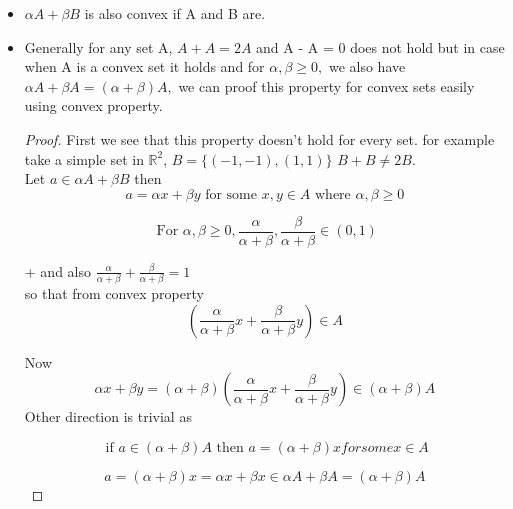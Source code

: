 \documentclass[oneside]{book}
\begin{document}
	
	\begin{itemize}
		\item $\alpha A+\beta B $ is also convex if A and B are. 
		\item
		Generally for any set A, $A +A = 2A $ and A - A = 0  does not hold but in case when A is a convex set it holds and 
		for $\alpha, \beta \geq 0,$ we also have $\alpha A+\beta A=(\alpha+\beta) A,$ we can proof this property for convex sets easily using convex property.
		\begin{proof}
			First we see that this property doesn't hold for every set.
			for example take a simple set in $\mathbb{R}^2$, $B = \{ (-1,-1),(1,1)\}$  $ B + B \neq 2B. $ \\
			Let $a \in \alpha A  + \beta B $ then $$a = \alpha x + \beta y \text{ for some } x, y \in A \text{ where } \alpha, \beta \geq 0 $$
			
			$$
			\text{ For } \alpha, \beta \geq 0, \frac{\alpha}{\alpha+\beta}, \frac{\beta}{\alpha+\beta} \in (0, 1) $$
			
			+ and also
			$ \frac{\alpha}{\alpha+\beta}+\frac{\beta}{\alpha+\beta}=1$ \\
			so that from convex property $$\left(\frac{\alpha}{\alpha+\beta} x+\frac{\beta}{\alpha+\beta} y\right) \in A
			$$
			
			Now 
			\[
			\alpha x+\beta y=(\alpha+\beta)\left(\frac{\alpha}{\alpha+\beta} x+\frac{\beta}{\alpha+\beta} y\right) \in(\alpha+\beta) A
			\]
			Other direction is trivial as 
			
			$$ \text{ if } a \in (\alpha +\beta) A \text{ then }
			a = (\alpha +\beta)x for some x \in A $$ 
			
			$$
			a = (\alpha +\beta)x =  \alpha x +\beta x \in \alpha A +\beta A
			= (\alpha + \beta )A $$
			
		\end{proof}
		
		
		
		
		
		
		
		
		
		
		
		
		
		
		
		
		
		
		
		
		
		
		
		
		
		
		
		
		
		
	\end{itemize}
	
\end{document}
